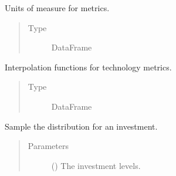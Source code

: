 \documentclass[letterpaper,10pt,english]{sphinxmanual}
\begin{document}
\begin{fulllineitems}
\begin{fulllineitems}
\begin{quote}
\begin{description}
\end{description}\end{quote}

\end{fulllineitems}


\begin{fulllineitems}
\label{\detokenize{doc-src/tyche:tyche.Evaluator.Evaluator.units}}
Units of measure for metrics.
\begin{quote}\begin{description}
\item[{Type}] \leavevmode
DataFrame

\end{description}\end{quote}

\end{fulllineitems}


\begin{fulllineitems}
\label{\detokenize{doc-src/tyche:tyche.Evaluator.Evaluator.interpolators}}
Interpolation functions for technology metrics.
\begin{quote}\begin{description}
\item[{Type}] \leavevmode
DataFrame

\end{description}\end{quote}

\end{fulllineitems}


\begin{fulllineitems}
\label{\detokenize{doc-src/tyche:tyche.Evaluator.Evaluator.evaluate}}
Sample the distribution for an investment.
\begin{quote}\begin{description}
\item[{Parameters}] \leavevmode
{} () \textendash{} The investment levels.


\end{description}
\end{quote}
\end{fulllineitems}
\end{fulllineitems}
\end{document}
